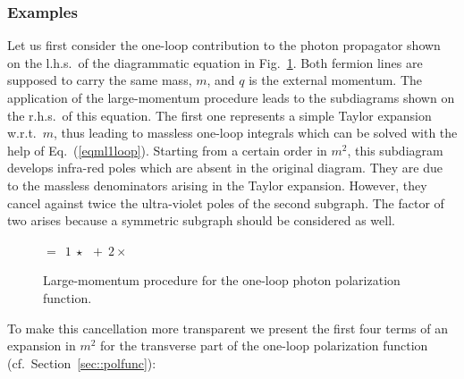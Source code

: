 \subsubsection{\label{subsubexa}Examples}
Let us first consider the one-loop contribution to the photon propagator
shown on the l.h.s.\ of the diagrammatic equation in
Fig.~\ref{fig::lmp1l}.  Both fermion lines are supposed to carry the
same mass, $m$, and $q$ is the external momentum.  The application of
the large-momentum procedure leads to the subdiagrams shown on the
r.h.s.\ of this equation.  The first one represents a simple Taylor
expansion w.r.t.\ $m$, thus leading to massless one-loop integrals which
can be solved with the help of Eq.~(\ref{eqml1loop}). Starting from a
certain order in $m^2$, this subdiagram develops infra-red poles which
are absent in the original diagram. They are due to the massless
denominators arising in the Taylor expansion.  However, they cancel
against twice the ultra-violet poles of the second subgraph.  The factor
of two arises because a symmetric subgraph should be considered as well.
%
\begin{figure}[t]
  \begin{center}
    \parbox{\captionwidth}{
  \leavevmode
  \epsfxsize=2.5cm
  \hspace{1em}
  \raisebox{2.1em}
  {\Large $= \ \ 1\ \star\,\, $}
  \epsfxsize=2.5cm
  \hspace{1em}
  \raisebox{2.1em}
  {\Large $+ \ \ 2\times \!\!\!\!$}
  \epsfxsize=2cm
  \hspace{-.5em}
  \raisebox{2.1em}{\Large $\star\,\,$}
  \epsfxsize=2.5cm
  \hspace{1em}}
    \parbox{\captionwidth}{
      \caption[]{\label{fig::lmp1l}\sloppy
        Large-momentum procedure for the one-loop photon polarization
        function.
        }      }
  \end{center}
\end{figure}
%
To make this cancellation more transparent we present the first four
terms of an expansion in $m^2$ for the transverse part of the one-loop
polarization function (cf.\ Section~\ref{sec::polfunc}):
